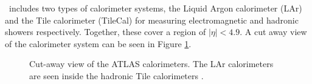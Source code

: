 \ATLAS\ includes two types of calorimeter systems, the Liquid Argon calorimeter (LAr) and the Tile calorimeter (TileCal) for measuring electromagnetic and hadronic showers respectively.
Together, these cover a region of $|\eta| < 4.9$.
A cut away view of the calorimeter system can be seen in Figure \ref{fig:detector:calorimeters}.
\begin{figure}[ht]
  \begin{center}
  \end{center}
  \caption[Cut-away view of the ATLAS calorimeters. The LAr calorimeters are seen inside the hadronic Tile  calorimeters]
          {Cut-away view of the ATLAS calorimeters. The LAr calorimeters are seen inside the hadronic Tile  calorimeters \cite{PERF-2007-01}.}
  \label{fig:detector:calorimeters}
\end{figure}

